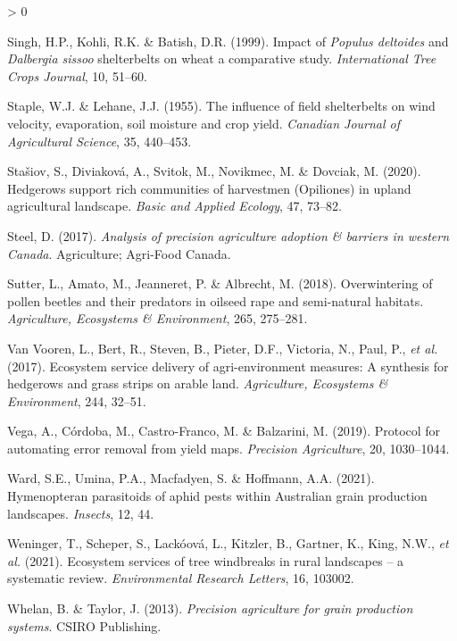 \documentclass[]{elsarticle} %
\newlength{\cslhangindent}
\newenvironment{CSLReferences}[2] %
 {%
  \setlength{\parindent}{0pt}
  \ifodd #1 \everypar{\setlength{\hangindent}{\cslhangindent}}\ignorespaces\fi
  \ifnum #2 > 0
  \setlength{\parskip}{#2\baselineskip}
  \fi
 }%
 {}
\begin{document}
\begin{CSLReferences}{1}{0}
\leavevmode\hypertarget{ref-singh1999}{}%
Singh, H.P., Kohli, R.K. \& Batish, D.R. (1999). Impact of {\emph{Populus deltoides}} and {\emph{Dalbergia sissoo}} shelterbelts on wheat {}a comparative study. \emph{International Tree Crops Journal}, 10, 51--60.

\leavevmode\hypertarget{ref-staple1955}{}%
Staple, W.J. \& Lehane, J.J. (1955). The influence of field shelterbelts on wind velocity, evaporation, soil moisture and crop yield. \emph{Canadian Journal of Agricultural Science}, 35, 440--453.

\leavevmode\hypertarget{ref-stasiov2020}{}%
Stašiov, S., Diviaková, A., Svitok, M., Novikmec, M. \& Dovciak, M. (2020). Hedgerows support rich communities of harvestmen ({Opiliones}) in upland agricultural landscape. \emph{Basic and Applied Ecology}, 47, 73--82.

\leavevmode\hypertarget{ref-steel2017}{}%
Steel, D. (2017). \emph{Analysis of precision agriculture adoption \& barriers in western {Canada}}. Agriculture; Agri-Food Canada.

\leavevmode\hypertarget{ref-sutter2018b}{}%
Sutter, L., Amato, M., Jeanneret, P. \& Albrecht, M. (2018). Overwintering of pollen beetles and their predators in oilseed rape and semi-natural habitats. \emph{Agriculture, Ecosystems {\&} Environment}, 265, 275--281.

\leavevmode\hypertarget{ref-vanVooren2017}{}%
Van Vooren, L., Bert, R., Steven, B., Pieter, D.F., Victoria, N., Paul, P., \emph{et al.} (2017). Ecosystem service delivery of agri-environment measures: A synthesis for hedgerows and grass strips on arable land. \emph{Agriculture, Ecosystems {\&} Environment}, 244, 32--51.

\leavevmode\hypertarget{ref-vega2019}{}%
Vega, A., Córdoba, M., Castro-Franco, M. \& Balzarini, M. (2019). Protocol for automating error removal from yield maps. \emph{Precision Agriculture}, 20, 1030--1044.

\leavevmode\hypertarget{ref-ward2021}{}%
Ward, S.E., Umina, P.A., Macfadyen, S. \& Hoffmann, A.A. (2021). Hymenopteran parasitoids of aphid pests within {Australian} grain production landscapes. \emph{Insects}, 12, 44.

\leavevmode\hypertarget{ref-weninger2021}{}%
Weninger, T., Scheper, S., Lackóová, L., Kitzler, B., Gartner, K., King, N.W., \emph{et al.} (2021). Ecosystem services of tree windbreaks in rural landscapes -- a systematic review. \emph{Environmental Research Letters}, 16, 103002.

\leavevmode\hypertarget{ref-whelan2013}{}%
Whelan, B. \& Taylor, J. (2013). \emph{Precision agriculture for grain production systems}. CSIRO Publishing.


\end{CSLReferences}
\end{document}
